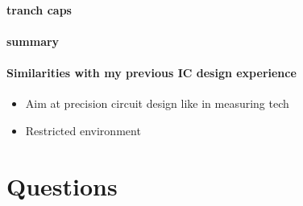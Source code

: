 \documentclass[a4paper,12pt]{article} %
\begin{document}
\paragraph{tranch caps}

\paragraph{summary}


\paragraph{Similarities with my previous IC design experience}
\begin{itemize}
    \item Aim at precision circuit design like in measuring tech
    \item Restricted environment
\end{itemize}

\section{Questions}
\end{document}
